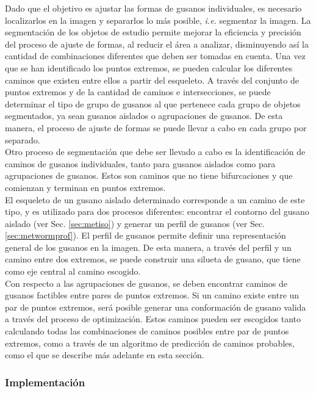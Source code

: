 Dado que el objetivo es ajustar las formas de gusanos individuales, es 
necesario localizarlos en la imagen y separarlos lo m\'as posible, 
\emph{i.e. }segmentar la imagen. La segmentaci\'on de los objetos 
de estudio permite mejorar la eficiencia y precisi\'on del proceso
de ajuste de formas, al reducir el \'area a analizar, disminuyendo as\'i
la cantidad de combinaciones diferentes que deben ser tomadas en cuenta.
Una vez que se han identificado los puntos extremos, se pueden calcular
los diferentes caminos que existen entre ellos a partir del esqueleto.
A trav\'es del conjunto de puntos extremos y de la cantidad de caminos e 
intersecciones, se puede determinar el tipo de grupo de gusanos al que
pertenece cada grupo de objetos segmentados, ya sean gusanos aislados
o agrupaciones de gusanos. De esta manera, el proceso de ajuste de formas
se puede llevar a cabo en cada grupo por separado.\\

Otro proceso de segmentaci\'on que debe ser llevado a cabo es la identificaci\'on
de caminos de gusanos individuales, tanto para gusanos aislados como para agrupaciones
de gusanos. Estos son caminos que no tiene bifurcaciones y que comienzan y terminan
en puntos extremos.\\
El esqueleto de un gusano aislado determinado corresponde a un camino de este tipo, y es
utilizado para dos procesos diferentes: encontrar el contorno del gusano aislado 
(ver Sec. \ref{sec:metiso}) y generar un perfil de gusanos (ver Sec. \ref{sec:metwormprof}).
El perfil de gusanos permite definir una representaci\'on general de los gusanos en 
la imagen. De esta manera, a trav\'es del perfil y un camino entre dos extremos, se puede
construir una silueta de gusano, que tiene como eje central al camino escogido. \\

Con respecto a las agrupaciones de gusanos, se deben encontrar caminos de gusanos factibles entre
pares de puntos extremos. Si un camino existe entre un par de puntos extremos, ser\'a posible
generar una conformaci\'on de gusano valida a trav\'es del proceso de optimizaci\'on. 
Estos caminos pueden ser escogidos tanto calculando todas las combinaciones de caminos posibles
entre par de puntos extremos, como a trav\'es de un algoritmo de predicci\'on de caminos probables,
como el que se describe m\'as adelante en esta secci\'on.

\subsubsection*{Implementaci\'on}

